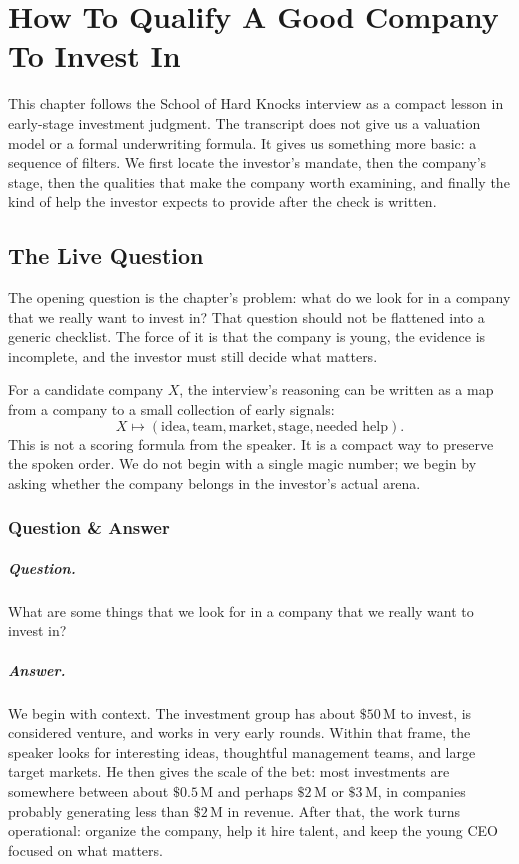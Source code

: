 \chapter{How To Qualify A Good Company To Invest In}

This chapter follows the School of Hard Knocks interview as a compact lesson in early-stage investment judgment. The transcript does not give us a valuation model or a formal underwriting formula. It gives us something more basic: a sequence of filters. We first locate the investor's mandate, then the company's stage, then the qualities that make the company worth examining, and finally the kind of help the investor expects to provide after the check is written.

\section{The Live Question}

The opening question is the chapter's problem: what do we look for in a company that we really want to invest in? That question should not be flattened into a generic checklist. The force of it is that the company is young, the evidence is incomplete, and the investor must still decide what matters.

For a candidate company \(X\), the interview's reasoning can be written as a map from a company to a small collection of early signals:
\begin{equation}
X
\longmapsto
\left(
\text{idea},
\text{team},
\text{market},
\text{stage},
\text{needed help}
\right).
\end{equation}
This is not a scoring formula from the speaker. It is a compact way to preserve the spoken order. We do not begin with a single magic number; we begin by asking whether the company belongs in the investor's actual arena.

\subsection{Question \& Answer}

\paragraph{Question.}
What are some things that we look for in a company that we really want to invest in?

\paragraph{Answer.}
We begin with context. The investment group has about \( \$50\,\mathrm{M} \) to invest, is considered venture, and works in very early rounds. Within that frame, the speaker looks for interesting ideas, thoughtful management teams, and large target markets. He then gives the scale of the bet: most investments are somewhere between about \( \$0.5\,\mathrm{M} \) and perhaps \( \$2\,\mathrm{M} \) or \( \$3\,\mathrm{M} \), in companies probably generating less than \( \$2\,\mathrm{M} \) in revenue. After that, the work turns operational: organize the company, help it hire talent, and keep the young CEO focused on what matters.

